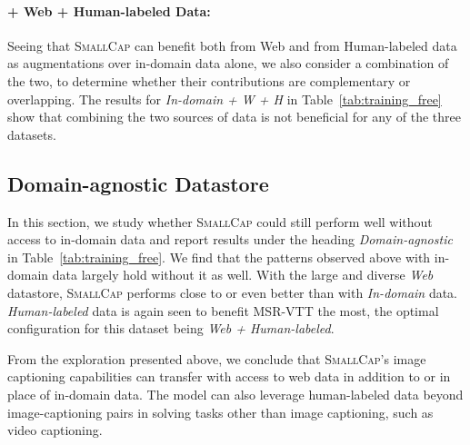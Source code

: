 \documentclass[10pt,twocolumn,letterpaper]{article}
\newcommand{\model}{\textsc{SmallCap}\xspace}
\begin{document}
\paragraph{+ Web + Human-labeled Data:}

Seeing that \model can benefit both from Web and from Human-labeled data as augmentations over in-domain data alone, we also consider a combination of the two, to determine whether their contributions are complementary or overlapping. The results for \textit{In-domain + W + H} in Table~\ref{tab:training_free} show that combining the two sources of data is not beneficial for any of the three datasets.




\subsection{Domain-agnostic Datastore}
\label{varying_datastore}

In this section, we study whether \model could still perform well without access to in-domain data and report results under the heading \emph{Domain-agnostic} in Table~\ref{tab:training_free}. We find that the patterns observed above with in-domain data largely hold without it as well. With the large and diverse \emph{Web} datastore, \textsc{SmallCap} performs close to or even better than with \textit{In-domain} data.  \emph{Human-labeled} data is again seen to benefit MSR-VTT the most, the optimal configuration for this dataset being \emph{Web + Human-labeled}.

From the exploration presented above, we conclude that \model's image captioning capabilities can transfer with access to web data in addition to or in place of in-domain data. The model can also leverage human-labeled data beyond image-captioning pairs in solving tasks other than image captioning, such as video captioning. 
\end{document}
